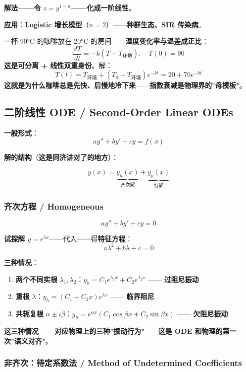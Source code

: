 \textbf{解法——令 $z = y^{1-n}$——化成一阶线性}。

\textbf{应用}：\textbf{Logistic 增长模型}（$n=2$）——\textbf{种群生态、SIR 传染病}。

\begin{example}
一杯 90°C 的咖啡放在 20°C 的房间——\textbf{温度变化率与温差成正比}：
\[
\frac{dT}{dt} = -k(T - T_{\text{环境}}), \quad T(0) = 90
\]
\textbf{这是可分离 + 线性双重身份}。解：
\[
T(t) = T_{\text{环境}} + (T_0 - T_{\text{环境}}) e^{-kt} = 20 + 70 e^{-kt}
\]
\textbf{这就是为什么咖啡总是先快、后慢地冷下来}——\textbf{指数衰减是物理界的"母模板"}。
\end{example}

\subsection{二阶线性 ODE / Second-Order Linear ODEs}

\textbf{一般形式}：
\[
a y'' + b y' + c y = f(x)
\]

\textbf{解的结构}（\textbf{这是同济讲对了的地方}）：

\[
y(x) = \underbrace{y_h(x)}_{\text{齐次解}} + \underbrace{y_p(x)}_{\text{特解}}
\]

\subsubsection{齐次方程 / Homogeneous}

\[
a y'' + b y' + c y = 0
\]

\textbf{试探解 $y = e^{\lambda x}$}——代入——得\textbf{特征方程}：
\[
a \lambda^2 + b \lambda + c = 0
\]

\textbf{三种情况}：

\begin{enumerate}
\item \textbf{两个不同实根} $\lambda_1, \lambda_2$：$y_h = C_1 e^{\lambda_1 x} + C_2 e^{\lambda_2 x}$ —— \textbf{过阻尼振动}
\item \textbf{重根} $\lambda$：$y_h = (C_1 + C_2 x) e^{\lambda x}$ —— \textbf{临界阻尼}
\item \textbf{共轭复根} $\alpha \pm i\beta$：$y_h = e^{\alpha x}(C_1 \cos\beta x + C_2 \sin\beta x)$ —— \textbf{欠阻尼振动}
\end{enumerate}

\textbf{这三种情况——对应物理上的三种"振动行为"}——\textbf{这是 ODE 和物理的第一次"语义对齐"}。

\subsubsection{非齐次：待定系数法 / Method of Undetermined Coefficients}

